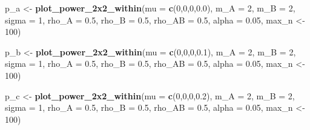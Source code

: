 \documentclass[]{article}
\newenvironment{Shaded}{\begin{snugshade}}{\end{snugshade}}
\newcommand{\KeywordTok}[1]{\textcolor[rgb]{0.13,0.29,0.53}{\textbf{#1}}}
\newcommand{\DataTypeTok}[1]{\textcolor[rgb]{0.13,0.29,0.53}{#1}}
\newcommand{\DecValTok}[1]{\textcolor[rgb]{0.00,0.00,0.81}{#1}}
\newcommand{\FloatTok}[1]{\textcolor[rgb]{0.00,0.00,0.81}{#1}}
\newcommand{\StringTok}[1]{\textcolor[rgb]{0.31,0.60,0.02}{#1}}
\newcommand{\NormalTok}[1]{#1}
\begin{document}
\begin{Shaded}
\begin{Highlighting}[]
\NormalTok{p_a <-}\StringTok{ }\KeywordTok{plot_power_2x2_within}\NormalTok{(}\DataTypeTok{mu =} \KeywordTok{c}\NormalTok{(}\DecValTok{0}\NormalTok{,}\DecValTok{0}\NormalTok{,}\DecValTok{0}\NormalTok{,}\FloatTok{0.0}\NormalTok{), }
                      \DataTypeTok{m_A =} \DecValTok{2}\NormalTok{, }
                      \DataTypeTok{m_B =} \DecValTok{2}\NormalTok{, }
                      \DataTypeTok{sigma =} \DecValTok{1}\NormalTok{, }
                      \DataTypeTok{rho_A =} \FloatTok{0.5}\NormalTok{, }
                      \DataTypeTok{rho_B =} \FloatTok{0.5}\NormalTok{, }
                      \DataTypeTok{rho_AB =} \FloatTok{0.5}\NormalTok{, }
                      \DataTypeTok{alpha =} \FloatTok{0.05}\NormalTok{,}
\NormalTok{                      max_n <-}\StringTok{ }\DecValTok{100}\NormalTok{)}

\NormalTok{p_b <-}\StringTok{ }\KeywordTok{plot_power_2x2_within}\NormalTok{(}\DataTypeTok{mu =} \KeywordTok{c}\NormalTok{(}\DecValTok{0}\NormalTok{,}\DecValTok{0}\NormalTok{,}\DecValTok{0}\NormalTok{,}\FloatTok{0.1}\NormalTok{), }
                      \DataTypeTok{m_A =} \DecValTok{2}\NormalTok{, }
                      \DataTypeTok{m_B =} \DecValTok{2}\NormalTok{, }
                      \DataTypeTok{sigma =} \DecValTok{1}\NormalTok{, }
                      \DataTypeTok{rho_A =} \FloatTok{0.5}\NormalTok{, }
                      \DataTypeTok{rho_B =} \FloatTok{0.5}\NormalTok{, }
                      \DataTypeTok{rho_AB =} \FloatTok{0.5}\NormalTok{, }
                      \DataTypeTok{alpha =} \FloatTok{0.05}\NormalTok{,}
\NormalTok{                      max_n <-}\StringTok{ }\DecValTok{100}\NormalTok{)}

\NormalTok{p_c <-}\StringTok{ }\KeywordTok{plot_power_2x2_within}\NormalTok{(}\DataTypeTok{mu =} \KeywordTok{c}\NormalTok{(}\DecValTok{0}\NormalTok{,}\DecValTok{0}\NormalTok{,}\DecValTok{0}\NormalTok{,}\FloatTok{0.2}\NormalTok{), }
                      \DataTypeTok{m_A =} \DecValTok{2}\NormalTok{, }
                      \DataTypeTok{m_B =} \DecValTok{2}\NormalTok{, }
                      \DataTypeTok{sigma =} \DecValTok{1}\NormalTok{, }
                      \DataTypeTok{rho_A =} \FloatTok{0.5}\NormalTok{, }
                      \DataTypeTok{rho_B =} \FloatTok{0.5}\NormalTok{, }
                      \DataTypeTok{rho_AB =} \FloatTok{0.5}\NormalTok{, }
                      \DataTypeTok{alpha =} \FloatTok{0.05}\NormalTok{,}
\NormalTok{                      max_n <-}\StringTok{ }\DecValTok{100}\NormalTok{)}


\end{Highlighting}
\end{Shaded}
\end{document}
